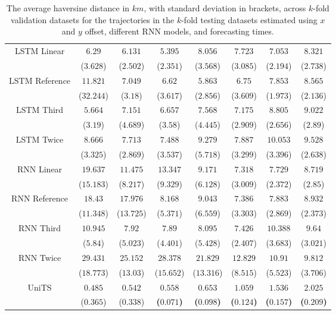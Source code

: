 \begin{table}[!ht]
{\begin{tabular}{|c|c|c|c|c|c|c|c|}
			\multirow{2}{*}{LSTM Linear} & $6.29$ & $6.131$ & $5.395$ & $8.056$ & $7.723$ & $7.053$ & $8.321$ \\
			 & ($3.628$) & ($2.502$) & ($2.351$) & ($3.568$) & ($3.085$) & ($2.194$) & ($2.738$) \\ \hline
			\multirow{2}{*}{LSTM Reference} & $11.821$ & $7.049$ & $6.62$ & $5.863$ & $6.75$ & $7.853$ & $8.565$ \\
			 & ($32.244$) & ($3.18$) & ($3.617$) & ($2.856$) & ($3.609$) & ($1.973$) & ($2.136$) \\ \hline
			\multirow{2}{*}{LSTM Third} & $5.664$ & $7.151$ & $6.657$ & $7.568$ & $7.175$ & $8.805$ & $9.022$ \\
			 & ($3.19$) & ($4.689$) & ($3.58$) & ($4.445$) & ($2.909$) & ($2.656$) & ($2.89$) \\ \hline
			\multirow{2}{*}{LSTM Twice} & $8.666$ & $7.713$ & $7.488$ & $9.279$ & $7.887$ & $10.053$ & $9.528$ \\
			 & ($3.325$) & ($2.869$) & ($3.537$) & ($5.718$) & ($3.299$) & ($3.396$) & ($2.638$) \\ \hline
			\multirow{2}{*}{RNN Linear} & $19.637$ & $11.475$ & $13.347$ & $9.171$ & $7.318$ & $7.729$ & $8.719$ \\
			 & ($15.183$) & ($8.217$) & ($9.329$) & ($6.128$) & ($3.009$) & ($2.372$) & ($2.85$) \\ \hline
			\multirow{2}{*}{RNN Reference} & $18.43$ & $17.976$ & $8.168$ & $9.043$ & $7.386$ & $7.883$ & $8.932$ \\
			 & ($11.348$) & ($13.725$) & ($5.371$) & ($6.559$) & ($3.303$) & ($2.869$) & ($2.373$) \\ \hline
			\multirow{2}{*}{RNN Third} & $10.945$ & $7.92$ & $7.89$ & $8.095$ & $7.426$ & $10.388$ & $9.64$ \\
			 & ($5.84$) & ($5.023$) & ($4.401$) & ($5.428$) & ($2.407$) & ($3.683$) & ($3.021$) \\ \hline
			\multirow{2}{*}{RNN Twice} & $29.431$ & $25.152$ & $28.378$ & $21.829$ & $12.829$ & $10.91$ & $9.812$ \\
			 & ($18.773$) & ($13.03$) & ($15.652$) & ($13.316$) & ($8.515$) & ($5.523$) & ($3.706$) \\ \hline
			\multirow{2}{*}{UniTS} & $0.485$ & $0.542$ & $\mathbf{0.558}$ & $\mathbf{0.653}$ & $\mathbf{1.059}$ & $\mathbf{1.536}$ & $\mathbf{2.025}$ \\
			 & ($0.365$) & ($0.338$) & \textbf{(}$\mathbf{0.071}$\textbf{)} & \textbf{(}$\mathbf{0.098}$\textbf{)} & \textbf{(}$\mathbf{0.124}$\textbf{)} & \textbf{(}$\mathbf{0.157}$\textbf{)} & \textbf{(}$\mathbf{0.209}$\textbf{)} \\ \hline
		\end{tabular}
	}
	\caption{The average haversine distance in $km$, with standard deviation in brackets, across $k$-fold validation datasets for the trajectories in the $k$-fold testing datasets estimated using $x$ and $y$ offset, different RNN models, and forecasting times.}
	\label{tab:all_no_abs_haversine}
\end{table}